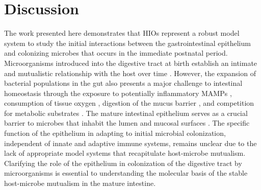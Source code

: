 \documentclass[9pt,lineo]{elife}
\begin{document}
\section*{{\bfseries\sffamily } Discussion}
\label{sec:orgheadline13}
The work presented here demonstrates that HIOs represent a robust model system to study the initial interactions between the gastrointestinal epithelium and colonizing microbes that occurs in the immediate postnatal period. Microorganisms introduced into the digestive tract at birth establish an intimate and mutualistic relationship with the host over time \citep{Costello:2012,Palmer:2007,Koenig:2011,Backhed:2015,Wopereis:2014}. However, the expansion of bacterial populations in the gut also presents a major challenge to intestinal homeostasis through the exposure to potentially inflammatory MAMPs \citep{Tanner:2015,Renz:2012}, consumption of tissue oxygen \citep{Glover:2016,Espey:2013,Albenberg:2014}, digestion of the mucus barrier \citep{Marcobal:2013,Desai:2016}, and competition for metabolic substrates \citep{Rivera-Chavez:2016,Kaiko:2016}. The mature intestinal epithelium serves as a crucial barrier to microbes that inhabit the lumen and mucosal surfaces \citep{Artis:2008,Turner:2009,Desai:2016,Kelly:2015,Cornick:2015,Peterson:2014,Hackam:2013,Turner:2009}. The specific function of the epithelium in adapting to initial microbial colonization, independent of innate and adaptive immune systems, remains unclear due to the lack of appropriate model systems that recapitulate host-microbe mutualism. Clarifying the role of the epithelium in colonization of the digestive tract by microorganisms is essential to understanding the molecular basis of the stable host-microbe mutualism in the mature intestine.
\end{document}
